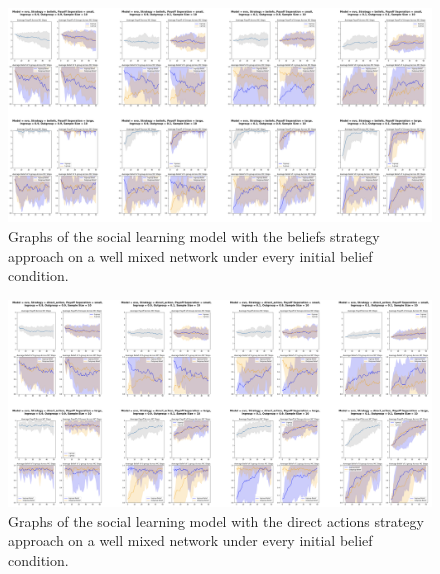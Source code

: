 \documentclass[]{llncs}
\begin{document}
\begin{figure}
\centering
\includegraphics[width=15cm]{images/social_wellmixed1}
\caption{\label{social_wellmixed1} Graphs of the social learning model with the beliefs strategy approach on a well mixed network under every initial belief condition.}
\end{figure}
\begin{figure}
\centering
\includegraphics[width=15cm]{images/social_wellmixed2}
\caption{\label{social_wellmixed2} Graphs of the social learning model with the direct actions strategy approach on a well mixed network under every initial belief condition.}
\end{figure}
\end{document}
